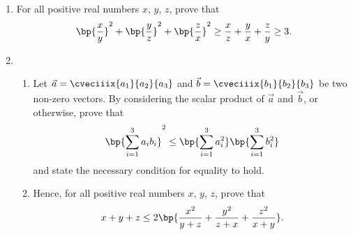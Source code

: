 \begin{problem}
    \begin{enumerate}
        \item For all positive real numbers $x$, $y$, $z$, prove that \[\bp{\frac{x}{y}}^2 + \bp{\frac{y}{z}}^2 + \bp{\frac{z}{x}}^2 \geq \frac{x}{z} + \frac{y}{x} + \frac{z}{y} \geq 3.\]
        \item \begin{enumerate}
            \item Let $\vec a = \cveciiix{a_1}{a_2}{a_3}$ and $\vec b = \cveciiix{b_1}{b_2}{b_3}$ be two non-zero vectors. By considering the scalar product of $\vec a$ and $\vec b$, or otherwise, prove that \[\bp{\sum_{i = 1}^3 a_i b_i}^2 \leq \bp{\sum_{i = 1}^3 a_i^2} \bp{\sum_{i = 1}^3 b_i^2}\] and state the necessary condition for equality to hold.
            \item Hence, for all positive real numbers $x$, $y$, $z$, prove that \[x + y + z \leq 2 \bp{\frac{x^2}{y+z} + \frac{y^2}{z + x} + \frac{z^2}{x + y}}.\]
        \end{enumerate}
    \end{enumerate}
\end{problem}
